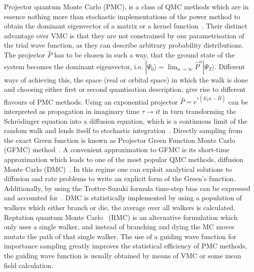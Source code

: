 \documentclass[final,3p,times,twocolumn]{elsarticle}
\begin{document}
		Projector quantum Monte Carlo (PMC), is a class of QMC methods which are in essence nothing more than stochastic implementations of the power method to obtain the dominant eigenvector of a matrix or a kernel function~\cite{gubernatis_kawashima_werner_2016}. Their distinct advantage over VMC is that they are not constrained by our parametrisation of the trial wave function, as they can describe arbitrary probability distributions. The projector $\hat P$ has to be chosen in such a way, that the ground state of the system becomes the dominant eigenvector, i.e. $| \Psi_{0}\rangle = \lim_{n\rightarrow \infty} \hat{P}^n |\Psi_{T}\rangle$. Different ways of achieving this, the space (real or orbital space) in which the walk is done and choosing either first or second quantisation description, give rise to different flavours of PMC methods. Using an exponential projector $\hat{P} = e^{\tau (E_T \mathbb{1} - \hat{H})}$ can be interpreted as propagation in imaginary time $\tau \rightarrow it$ in turn transforming the Schr\"odinger equation into a diffusion equation, which is a continuous limit of the random walk and lends itself to stochastic integration~\cite{reynolds1990diffusion}. 
		Directly sampling from the exact Green function is known as Projector Green Function Monte Carlo (GFMC) method~\cite{kalos1962monte, kalos1966stochastic}. A convenient approximation to GFMC is its short-time approximation which leads to one of the most popular QMC methods, diffusion Monte Carlo (DMC)~\cite{foulkes2001quantum, reynolds1990diffusion}. In this regime one can exploit analytical solutions to diffusion and rate problems to write an explicit form of the Green's function. Additionally, by using the Trotter-Suzuki formula time-step bias can be expressed and accounted for~\cite{austin2012quantum}. DMC is statistically implemented by using a population of walkers which either branch or die, the average over all walkers is calculated. Reptation quantum Monte Carlo~\cite{reynolds1990diffusion} (RMC) is an alternative formulation which only uses a single walker, and instead of branching and dying the MC moves mutate the path of that single walker. The use of a guiding wave function for importance sampling greatly improves the statistical efficiency of PMC methods, the guiding wave function is usually obtained by means of VMC or some mean field calculation. 
		
\end{document}
